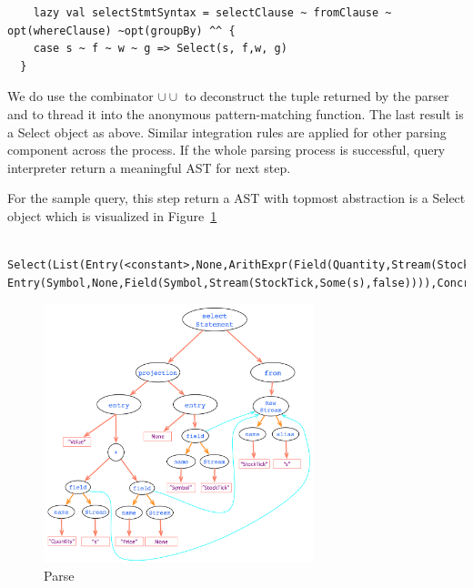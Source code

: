\begin{itemize}
\begin{lstlisting}
	lazy val selectStmtSyntax = selectClause ~ fromClause ~ opt(whereClause) ~opt(groupBy) ^^ {
    case s ~ f ~ w ~ g => Select(s, f,w, g)
  }
\end{lstlisting}

We do use the combinator $\cup \cup$ to deconstruct the tuple returned by the parser and to thread it into the anonymous pattern-matching function. The last result is a Select object as above. Similar integration rules are applied for other parsing component across the process. 
If the whole parsing process is successful, query interpreter return a meaningful AST for next step. 

For the sample query, this step return a AST with topmost abstraction is a Select object which is visualized in Figure~\ref{fig:Parse}

\begin{lstlisting}
	Select(List(Entry(<constant>,None,ArithExpr(Field(Quantity,Stream(StockTick,Some(s),false)),*,Field(Price,Stream(StockTick,Some(s),false)))), Entry(Symbol,None,Field(Symbol,Stream(StockTick,Some(s),false)))),ConcreteStream(Stream(StockTick,Some(s),false),None,None),None,None)

\end{lstlisting}
 



\end{itemize}


\begin{figure}[h!] 
\centering    
\includegraphics[width=0.7\textwidth]{Parse}
\caption{Parse}
\label{fig:Parse}
\end{figure}


